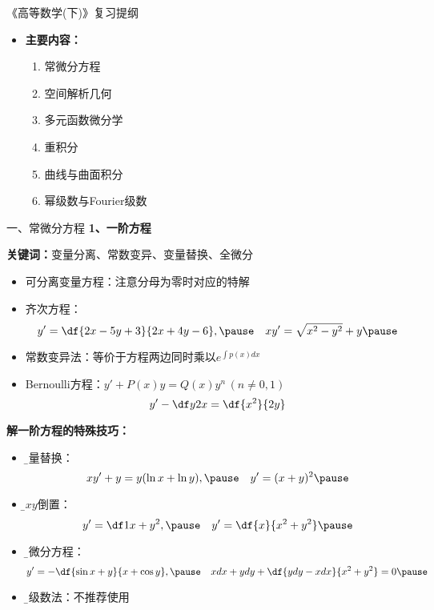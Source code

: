 
\begin{frame}{《高等数学(下)》复习提纲}
	\linespread{1.5}
	\begin{itemize}
	  \item {\bf 主要内容：}
	  \begin{enumerate}
		\item 常微分方程
		\item 空间解析几何
		\item 多元函数微分学
		\item 重积分
		\item 曲线与曲面积分
		\item 幂级数与Fourier级数
	  \end{enumerate}
	\end{itemize}
\end{frame}

\begin{frame}{一、常微分方程}
	\linespread{1.2}\pause 
	{\bf 1、一阶方程}\pause 
	
	{\b{\bf 关键词：}\pause 变量分离、\pause 常数变异、\pause 变量替换、\pause 全微分}\pause 
	\begin{itemize}
	  \item 可分离变量方程：\pause 注意分母为零时对应的特解\pause 
	  \item 齐次方程：\pause 
	  $$y'=\df{2x-5y+3}{2x+4y-6},\pause \quad xy'=\sqrt{x^2-y^2}+y\pause $$
	  \vspace{-1em}
	  \item 常数变异法：\pause 等价于方程两边同时乘以$e^{\int p(x)dx}$\pause 
	  \item Bernoulli方程：\pause $y'+P(x)y=Q(x)y^n\,(n\ne 0,1)$\pause 
	  $$y'-\df y{2x}=\df{x^2}{2y}$$
	\end{itemize}
\end{frame}

\begin{frame}
	\linespread{1.2}
	{\bf 解一阶方程的特殊技巧：}\pause 
	\begin{itemize}
	  \item {\b 变量替换：}\pause 
	  $$xy'+y=y(\ln x+\ln y),\pause \quad y'=(x+y)^2\pause $$
	  \vspace{-2em}
	  \item {\b $xy$倒置：}\pause 
	  $$y'=\df 1{x+y^2},\pause \quad y'=\df{x}{x^2+y^2}\pause $$
	  \vspace{-1em}
	  \item {\b 全微分方程：}\pause 
	  $$y'=-\df{\sin x+y}{x+\cos y},\pause \quad
	  xdx+ydy+\df{ydy-xdx}{x^2+y^2}=0\pause $$
	  \vspace{-1em}
	  \item {\b 幂级数法：}\pause 不推荐使用
	\end{itemize}
\end{frame}

